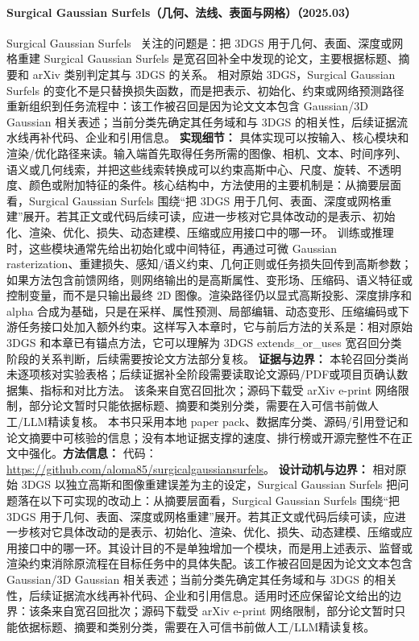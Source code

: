 \paragraph{Surgical Gaussian Surfels（几何、法线、表面与网格）（2025.03）}
Surgical Gaussian Surfels~\cite{2503_04079} 关注的问题是：把 3DGS 用于几何、表面、深度或网格重建 Surgical Gaussian Surfels 是宽召回补全中发现的论文，主要根据标题、摘要和 arXiv 类别判定其与 3DGS 的关系。
相对原始 3DGS，Surgical Gaussian Surfels 的变化不是只替换损失函数，而是把表示、初始化、约束或网络预测路径重新组织到任务流程中：该工作被召回是因为论文文本包含 Gaussian/3D Gaussian 相关表述；当前分类先确定其任务域和与 3DGS 的相关性，后续证据流水线再补代码、企业和引用信息。
\textbf{实现细节：} 具体实现可以按输入、核心模块和渲染/优化路径来读。输入端首先取得任务所需的图像、相机、文本、时间序列、语义或几何线索，并把这些线索转换成可以约束高斯中心、尺度、旋转、不透明度、颜色或附加特征的条件。核心结构中，方法使用的主要机制是：从摘要层面看，Surgical Gaussian Surfels 围绕“把 3DGS 用于几何、表面、深度或网格重建”展开。若其正文或代码后续可读，应进一步核对它具体改动的是表示、初始化、渲染、优化、损失、动态建模、压缩或应用接口中的哪一环。 训练或推理时，这些模块通常先给出初始化或中间特征，再通过可微 Gaussian rasterization、重建损失、感知/语义约束、几何正则或任务损失回传到高斯参数；如果方法包含前馈网络，则网络输出的是高斯属性、变形场、压缩码、语义特征或控制变量，而不是只输出最终 2D 图像。渲染路径仍以显式高斯投影、深度排序和 alpha 合成为基础，只是在采样、属性预测、局部编辑、动态变形、压缩编码或下游任务接口处加入额外约束。这样写入本章时，它与前后方法的关系是：相对原始 3DGS 和本章已有锚点方法，它可以理解为 3DGS extends\_or\_uses 宽召回分类阶段的关系判断，后续需要按论文方法部分复核。
\textbf{证据与边界：} 本轮召回分类尚未逐项核对实验表格；后续证据补全阶段需要读取论文源码/PDF或项目页确认数据集、指标和对比方法。 该条来自宽召回批次；源码下载受 arXiv e-print 网络限制，部分论文暂时只能依据标题、摘要和类别分类，需要在入可信书前做人工/LLM精读复核。 本书只采用本地 paper pack、数据库分类、源码/引用登记和论文摘要中可核验的信息；没有本地证据支撑的速度、排行榜或开源完整性不在正文中强化。\textbf{方法信息：} 代码：\url{https://github.com/aloma85/surgicalgaussiansurfels}。
\textbf{设计动机与边界：} 相对原始 3DGS 以独立高斯和图像重建误差为主的设定，Surgical Gaussian Surfels 把问题落在以下可实现的改动上：从摘要层面看，Surgical Gaussian Surfels 围绕“把 3DGS 用于几何、表面、深度或网格重建”展开。若其正文或代码后续可读，应进一步核对它具体改动的是表示、初始化、渲染、优化、损失、动态建模、压缩或应用接口中的哪一环。其设计目的不是单独增加一个模块，而是用上述表示、监督或渲染约束消除原流程在目标任务中的具体失配。该工作被召回是因为论文文本包含 Gaussian/3D Gaussian 相关表述；当前分类先确定其任务域和与 3DGS 的相关性，后续证据流水线再补代码、企业和引用信息。适用时还应保留论文给出的边界：该条来自宽召回批次；源码下载受 arXiv e-print 网络限制，部分论文暂时只能依据标题、摘要和类别分类，需要在入可信书前做人工/LLM精读复核。
